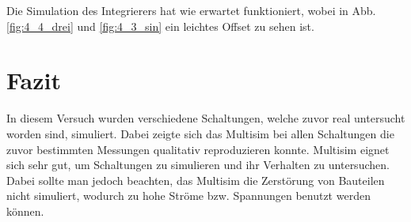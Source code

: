 \documentclass[12pt,a4paper]{article}
\begin{document}
Die Simulation des Integrierers hat wie erwartet funktioniert, wobei in Abb.\ref{fig:4_4_drei} und \ref{fig:4_3_sin} ein leichtes Offset zu sehen ist.

\section{Fazit}

In diesem Versuch wurden verschiedene Schaltungen, welche zuvor real untersucht worden sind, simuliert. Dabei zeigte sich das Multisim bei allen Schaltungen die zuvor bestimmten Messungen qualitativ reproduzieren konnte. Multisim eignet sich sehr gut, um Schaltungen zu simulieren und ihr Verhalten zu untersuchen. Dabei sollte man jedoch beachten, das Multisim die Zerstörung von Bauteilen nicht simuliert, wodurch zu hohe Ströme bzw. Spannungen benutzt werden können.
\end{document}
